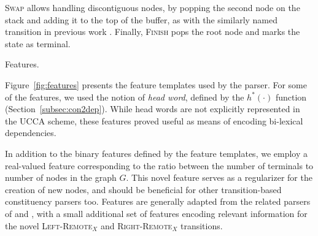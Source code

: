 \documentclass[11pt]{article}
\makeatletter
\newcommand{\secref}[1]{Section~\ref{#1}}
\newcommand{\figref}[1]{Figure~\ref{#1}}
\renewcommand{\paragraph}{
  \@startsection{paragraph}{4}
  {\z@}{.5ex \@plus .5ex \@minus .2ex}{-1em}
  {\normalfont\normalsize\bfseries}
}
\makeatother
\begin{document}
\textsc{Swap} allows handling discontiguous nodes, by popping the second
node on the stack and adding it to the top of the buffer, as with the similarly
named transition in previous work \cite{nivre2009non,maier2015discontinuous}.
Finally, \textsc{Finish} pops the root node and marks the state as terminal.

\paragraph{Features.}
\label{subsec:features}

\figref{fig:features} presents the feature templates used by the parser.
For some of the features, we used the notion of \textit{head word},
defined by the $h^*(\cdot)$ function (\secref{subsec:con2dep}).
While head words are not explicitly represented in the UCCA scheme, these
features proved useful as means of encoding bi-lexical dependencies.

In addition to the binary features defined by the feature templates,
we employ a real-valued feature corresponding to the ratio between the number of terminals to number of nodes
in the graph $G$. This novel feature serves as a regularizer for the creation of new nodes, and should be beneficial for other transition-based constituency parsers too.
Features are generally adapted from the related parsers of  and
, with a small additional set of features encoding relevant information
for the novel \textsc{Left-Remote$_X$} and \textsc{Right-Remote$_X$} transitions.


\end{document}
